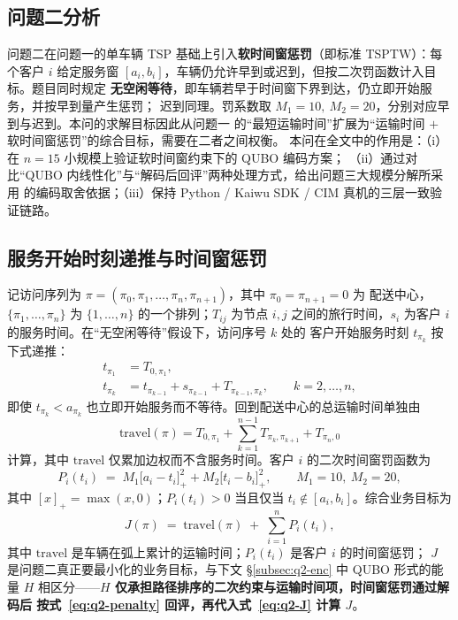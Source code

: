 \documentclass[UTF8,12pt,a4paper]{ctexart}
\begin{document}
\subsection{问题二分析}

问题二在问题一的单车辆 TSP 基础上引入\textbf{软时间窗惩罚}（即标准 TSPTW\cite{solomon1987vrptw}）：每个客户 $i$ 给定服务窗
$[a_i,b_i]$，车辆仍允许早到或迟到，但按二次罚函数计入目标。题目同时规定
\textbf{无空闲等待}，即车辆若早于时间窗下界到达，仍立即开始服务，并按早到量产生惩罚；
迟到同理。罚系数取 $M_1=10,\ M_2=20$，分别对应早到与迟到。本问的求解目标因此从问题一
的``最短运输时间''扩展为``运输时间 $+$ 软时间窗惩罚''的综合目标，需要在二者之间权衡。
本问在全文中的作用是：（i）在 $n=15$ 小规模上验证软时间窗约束下的 QUBO 编码方案；
（ii）通过对比``QUBO 内线性化''与``解码后回评''两种处理方式，给出问题三大规模分解所采用
的编码取舍依据；（iii）保持 Python / Kaiwu SDK / CIM 真机的三层一致验证链路。

\subsection{服务开始时刻递推与时间窗惩罚}
\label{subsec:q2-time}

记访问序列为 $\pi=(\pi_0,\pi_1,\dots,\pi_n,\pi_{n+1})$，其中 $\pi_0=\pi_{n+1}=0$ 为
配送中心，$\{\pi_1,\dots,\pi_n\}$ 为 $\{1,\dots,n\}$ 的一个排列；$T_{ij}$ 为节点 $i,j$
之间的旅行时间，$s_i$ 为客户 $i$ 的服务时间。在``无空闲等待''假设下，访问序号 $k$ 处的
客户开始服务时刻 $t_{\pi_k}$ 按下式递推：
\begin{align}
t_{\pi_1} &= T_{0,\pi_1},
   \label{eq:q2-t-first}\\[2pt]
t_{\pi_k} &= t_{\pi_{k-1}} + s_{\pi_{k-1}} + T_{\pi_{k-1},\pi_k},\qquad k=2,\dots,n,
   \label{eq:q2-t-rec}
\end{align}
即使 $t_{\pi_k} < a_{\pi_k}$ 也立即开始服务而不等待。回到配送中心的总运输时间单独由
\begin{equation}
\label{eq:q2-travel}
\mathrm{travel}(\pi) = T_{0,\pi_1} + \sum_{k=1}^{n-1} T_{\pi_k,\pi_{k+1}} + T_{\pi_n,0}
\end{equation}
计算，其中 $\mathrm{travel}$ 仅累加边权而不含服务时间。客户 $i$ 的二次时间窗罚函数为
\begin{equation}
\label{eq:q2-penalty}
P_i(t_i) \;=\; M_1\bigl[a_i - t_i\bigr]_{+}^{2} + M_2\bigl[t_i - b_i\bigr]_{+}^{2},\qquad
M_1 = 10,\ M_2 = 20,
\end{equation}
其中 $[x]_{+}=\max(x,0)$；$P_i(t_i)>0$ 当且仅当 $t_i \notin [a_i,b_i]$。综合业务目标为
\begin{equation}
\label{eq:q2-J}
J(\pi) \;=\; \mathrm{travel}(\pi) \;+\; \sum_{i=1}^{n} P_i(t_i),
\end{equation}
其中 $\mathrm{travel}$ 是车辆在弧上累计的运输时间；$P_i(t_i)$ 是客户 $i$ 的时间窗惩罚；
$J$ 是问题二真正要最小化的业务目标，与下文 §\ref{subsec:q2-enc} 中 QUBO 形式的能量
$H$ 相区分——\textbf{$H$ 仅承担路径排序的二次约束与运输时间项，时间窗惩罚通过解码后
按式~\eqref{eq:q2-penalty} 回评，再代入式~\eqref{eq:q2-J} 计算 $J$}。
\end{document}
